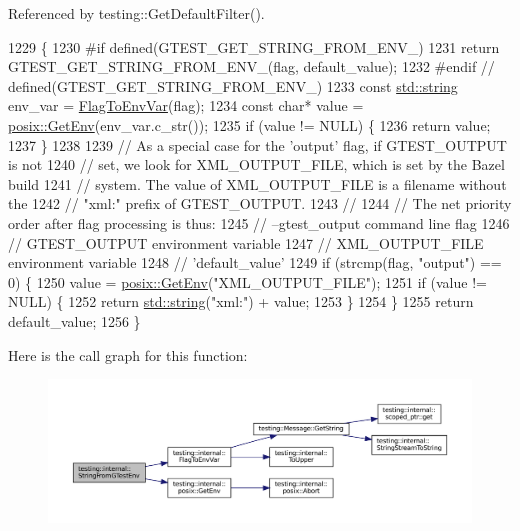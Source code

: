 Referenced by testing\+::\+Get\+Default\+Filter().


\begin{DoxyCode}
1229                                                                           \{
1230 \textcolor{preprocessor}{#if defined(GTEST\_GET\_STRING\_FROM\_ENV\_)}
1231   \textcolor{keywordflow}{return} GTEST\_GET\_STRING\_FROM\_ENV\_(flag, default\_value);
1232 \textcolor{preprocessor}{#endif  // defined(GTEST\_GET\_STRING\_FROM\_ENV\_)}
1233   \textcolor{keyword}{const} \hyperlink{namespacetesting_1_1internal_a8e8ff5b11e64078831112677156cb111}{std::string} env\_var = \hyperlink{namespacetesting_1_1internal_a7540386ecf74d7ab7e2fa6089db94682}{FlagToEnvVar}(flag);
1234   \textcolor{keyword}{const} \textcolor{keywordtype}{char}* value = \hyperlink{namespacetesting_1_1internal_1_1posix_a1d5e3da5a27eed25986859fa83cafe95}{posix::GetEnv}(env\_var.c\_str());
1235   \textcolor{keywordflow}{if} (value != NULL) \{
1236     \textcolor{keywordflow}{return} value;
1237   \}
1238 
1239   \textcolor{comment}{// As a special case for the 'output' flag, if GTEST\_OUTPUT is not}
1240   \textcolor{comment}{// set, we look for XML\_OUTPUT\_FILE, which is set by the Bazel build}
1241   \textcolor{comment}{// system.  The value of XML\_OUTPUT\_FILE is a filename without the}
1242   \textcolor{comment}{// "xml:" prefix of GTEST\_OUTPUT.}
1243   \textcolor{comment}{//}
1244   \textcolor{comment}{// The net priority order after flag processing is thus:}
1245   \textcolor{comment}{//   --gtest\_output command line flag}
1246   \textcolor{comment}{//   GTEST\_OUTPUT environment variable}
1247   \textcolor{comment}{//   XML\_OUTPUT\_FILE environment variable}
1248   \textcolor{comment}{//   'default\_value'}
1249   \textcolor{keywordflow}{if} (strcmp(flag, \textcolor{stringliteral}{"output"}) == 0) \{
1250     value = \hyperlink{namespacetesting_1_1internal_1_1posix_a1d5e3da5a27eed25986859fa83cafe95}{posix::GetEnv}(\textcolor{stringliteral}{"XML\_OUTPUT\_FILE"});
1251     \textcolor{keywordflow}{if} (value != NULL) \{
1252       \textcolor{keywordflow}{return} \hyperlink{namespacetesting_1_1internal_a8e8ff5b11e64078831112677156cb111}{std::string}(\textcolor{stringliteral}{"xml:"}) + value;
1253     \}
1254   \}
1255   \textcolor{keywordflow}{return} default\_value;
1256 \}
\end{DoxyCode}
Here is the call graph for this function\+:
\nopagebreak
\begin{figure}[H]
\begin{center}
\leavevmode
\includegraphics[width=350pt]{namespacetesting_1_1internal_ac54dabc540bf79c2de91add679bfb93b_cgraph}
\end{center}
\end{figure}
